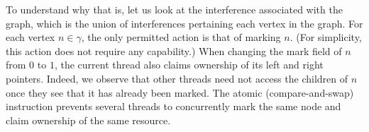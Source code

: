 To understand why that is, let us look at the interference associated
with the graph, which is the union of interferences pertaining each
vertex in the graph. For each vertex $n \in \gamma$, the only
permitted action is that of marking $n$. (For simplicity, this action
does not require any capability.)  When changing the mark field of $n$
from $0$ to $1$, the current thread also claims ownership of its left
and right pointers. Indeed, we observe that other threads need not
access the children of $n$ once they see that it has already been
marked. The atomic  (compare-and-swap) instruction prevents
several threads to concurrently mark the same node and claim ownership
of the same resource.

